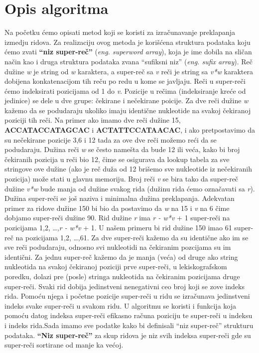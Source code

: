 \documentclass[a4paper]{article}
\begin{document}
{\section{Opis algoritma}
\label{opis_algoritma}
Na početku ćemo opisati metod koji se koristi za izračunavanje preklapanja izmedju ridova. Za realizaciju ovog metoda je korišćena struktura podataka koju ćemo zvati \textbf{``niz super-reč''} (\textit{eng. superword array}), koja je ime dobila na sličan način kao i druga struktura podataka zvana ``sufiksni niz'' (\textit{eng. sufix array}). Reč dužine \textit{w} je string od \textit{w} karaktera, a super-reč sa \textit{v} reči je string sa \textit{v*w} karaktera dobijena konkatenacijom tih reču po redu u kome se javljaju. Reči u super-reči ćemo indeksirati pozicijama od 1 do \textit{v}. Pozicije u rečima (indeksiranje kreće od jedinice) se dele u dve grupe: čekirane i nečekirane poicije. Za dve reči dužine \textit{w} kažemo da se podudaraju ukoliko imaju identične nukleotide na svakoj čekiranoj poziciji tih reči. Na primer ako imamo dve reči dužine 15, \textbf{ACCATACCATAGCAC} i \textbf{ACTATTCCATAACAC}, i ako pretpostavimo da su nečekirane pozicije 3,6 i 12 tada za ove dve reči možemo reći da se podudaraju. Dužina reči \textit{w} se često namešta da bude 12 ili veća, kako bi broj čekiranih pozicija u reči bio 12, čime se osigurava da lookup tabela za sve stringove ove dužine (ako je reč duža od 12 brišemo sve nukleotide iz nečekiranih pozicija) može stati u glavnu memoriju. Broj reči \textit{v} se bira tako da super-reč dužine \textit{v*w} bude manja od dužine svakog rida (dužinu rida ćemo označavati sa  \textit{r}). Dužina super-reči se još naziva i minimalna dužina preklapanja. Adekvatan primer za ridove dužine 150 bi bio da postavimo da \textit{w} na 15 i \textit{v} na 6 čime dobjamo super-reči dužine 90. Rid dužine \textit{r} ima \textit{r - w*v }+ 1 super-reči na pozicijama 1,2, \ldots ,\textit{r - w*v }+ 1. U našem primeru bi rid dužine 150 imao 61 super-reč na pozicijama 1,2, \ldots ,61. Za dve super-reči kažemo da su identične ako im se sve reči podudaraju, odnosno svi nukleotidi na čekiranim pozcijama su im identični. Za jednu super-reč kažemo da je manja (veća) od druge ako string nukleotida na svakoj čekiranoj poziciji prve super-reči, u lekiskografskom poredku, dolazi pre (posle) stringa nukleotida na čekiranim pozicijama druge super-reči. Svaki rid dobija jedinstveni nenegativni ceo broj koji se zove indeks rida. Pomoću njega i početne pozicije super-reči u ridu se izračunava jedinstveni indeks svake super-reči u svakom ridu. U algoritmu se koristi i funkcija koja pomoću datog indeksa super-reči efikasno računa poziciju te super-reči u indeksu i indeks rida.Sada imamo sve podatke kako bi definisali ``niz super-reč'' strukturu podataka. \textbf{``Niz super-reč''} za skup ridova je niz svih indeksa super-reči gde su super-reči sortirane od manje ka većoj.

}
\end{document}
